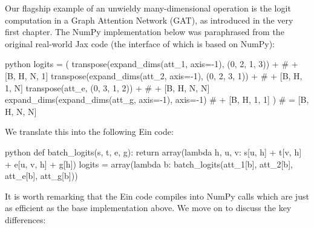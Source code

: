 Our flagship example of an unwieldy many-dimensional operation is the logit computation in a Graph Attention Network (GAT), as introduced in the very first chapter. The NumPy implementation below was paraphrased from the original real-world Jax code (the interface of which is based on NumPy):
\begin{center}
\begin{cminted}{python}
logits = (
    transpose(expand_dims(att_1, axis=-1), (0, 2, 1, 3)) +  # + [B, H, N, 1]
    transpose(expand_dims(att_2, axis=-1), (0, 2, 3, 1)) +  # + [B, H, 1, N]
    transpose(att_e, (0, 3, 1, 2)) +                        # + [B, H, N, N]
    expand_dims(expand_dims(att_g, axis=-1), axis=-1)       # + [B, H, 1, 1]
)                                                           # = [B, H, N, N]
\end{cminted}
\end{center}
We translate this into the following Ein code:
\begin{center}
\begin{cminted}{python}
def batch_logits(s, t, e, g):
    return array(lambda h, u, v: s[u, h] + t[v, h] + e[u, v, h] + g[h])
logits = array(lambda b: batch_logits(att_1[b], att_2[b], att_e[b], att_g[b]))
\end{cminted}
\end{center}
It is worth remarking that the Ein code compiles into NumPy calls which are just as efficient as the base implementation above. We move on to discuss the key differences:


